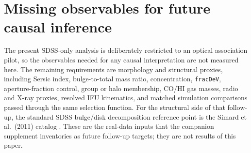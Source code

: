 \documentclass[twocolumn]{aastex631}
\begin{document}
\section{Missing observables for future causal inference}
The present SDSS-only analysis is deliberately restricted to an optical association pilot, so the observables needed for any causal interpretation are not measured here. The remaining requirements are morphology and structural proxies, including Sersic index, bulge-to-total mass ratio, concentration, \texttt{fracDeV}, aperture-fraction control, group or halo membership, CO/HI gas masses, radio and X-ray proxies, resolved IFU kinematics, and matched simulation comparisons passed through the same selection function. For the structural side of that follow-up, the standard SDSS bulge/disk decomposition reference point is the Simard et al.\ (2011) catalog \citep{simard2011}. These are the real-data inputs that the companion supplement inventories as future follow-up targets; they are not results of this paper.
\end{document}
